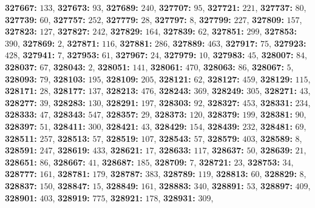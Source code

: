 \textsf{\bfseries 327667:} $133$, \textsf{\bfseries 327673:} $93$, \textsf{\bfseries 327689:} $240$, \textsf{\bfseries 327707:} $95$, \textsf{\bfseries 327721:} $221$, \textsf{\bfseries 327737:} $80$, \textsf{\bfseries 327739:} $60$, \textsf{\bfseries 327757:} $252$, \textsf{\bfseries 327779:} $28$, \textsf{\bfseries 327797:} $8$, \textsf{\bfseries 327799:} $227$, \textsf{\bfseries 327809:} $157$, \textsf{\bfseries 327823:} $127$, \textsf{\bfseries 327827:} $242$, \textsf{\bfseries 327829:} $164$, \textsf{\bfseries 327839:} $62$, \textsf{\bfseries 327851:} $299$, \textsf{\bfseries 327853:} $390$, \textsf{\bfseries 327869:} $2$, \textsf{\bfseries 327871:} $116$, \textsf{\bfseries 327881:} $286$, \textsf{\bfseries 327889:} $463$, \textsf{\bfseries 327917:} $75$, \textsf{\bfseries 327923:} $428$, \textsf{\bfseries 327941:} $7$, \textsf{\bfseries 327953:} $61$, \textsf{\bfseries 327967:} $24$, \textsf{\bfseries 327979:} $10$, \textsf{\bfseries 327983:} $45$, \textsf{\bfseries 328007:} $84$, \textsf{\bfseries 328037:} $67$, \textsf{\bfseries 328043:} $2$, \textsf{\bfseries 328051:} $141$, \textsf{\bfseries 328061:} $470$, \textsf{\bfseries 328063:} $86$, \textsf{\bfseries 328067:} $5$, \textsf{\bfseries 328093:} $79$, \textsf{\bfseries 328103:} $195$, \textsf{\bfseries 328109:} $205$, \textsf{\bfseries 328121:} $62$, \textsf{\bfseries 328127:} $459$, \textsf{\bfseries 328129:} $115$, \textsf{\bfseries 328171:} $28$, \textsf{\bfseries 328177:} $137$, \textsf{\bfseries 328213:} $476$, \textsf{\bfseries 328243:} $369$, \textsf{\bfseries 328249:} $305$, \textsf{\bfseries 328271:} $43$, \textsf{\bfseries 328277:} $39$, \textsf{\bfseries 328283:} $130$, \textsf{\bfseries 328291:} $197$, \textsf{\bfseries 328303:} $92$, \textsf{\bfseries 328327:} $453$, \textsf{\bfseries 328331:} $234$, \textsf{\bfseries 328333:} $47$, \textsf{\bfseries 328343:} $547$, \textsf{\bfseries 328357:} $29$, \textsf{\bfseries 328373:} $120$, \textsf{\bfseries 328379:} $199$, \textsf{\bfseries 328381:} $90$, \textsf{\bfseries 328397:} $51$, \textsf{\bfseries 328411:} $300$, \textsf{\bfseries 328421:} $43$, \textsf{\bfseries 328429:} $154$, \textsf{\bfseries 328439:} $232$, \textsf{\bfseries 328481:} $69$, \textsf{\bfseries 328511:} $257$, \textsf{\bfseries 328513:} $57$, \textsf{\bfseries 328519:} $107$, \textsf{\bfseries 328543:} $57$, \textsf{\bfseries 328579:} $403$, \textsf{\bfseries 328589:} $8$, \textsf{\bfseries 328591:} $247$, \textsf{\bfseries 328619:} $433$, \textsf{\bfseries 328621:} $17$, \textsf{\bfseries 328633:} $117$, \textsf{\bfseries 328637:} $50$, \textsf{\bfseries 328639:} $21$, \textsf{\bfseries 328651:} $86$, \textsf{\bfseries 328667:} $41$, \textsf{\bfseries 328687:} $185$, \textsf{\bfseries 328709:} $7$, \textsf{\bfseries 328721:} $23$, \textsf{\bfseries 328753:} $34$, \textsf{\bfseries 328777:} $161$, \textsf{\bfseries 328781:} $179$, \textsf{\bfseries 328787:} $383$, \textsf{\bfseries 328789:} $119$, \textsf{\bfseries 328813:} $60$, \textsf{\bfseries 328829:} $8$, \textsf{\bfseries 328837:} $150$, \textsf{\bfseries 328847:} $15$, \textsf{\bfseries 328849:} $161$, \textsf{\bfseries 328883:} $340$, \textsf{\bfseries 328891:} $53$, \textsf{\bfseries 328897:} $409$, \textsf{\bfseries 328901:} $403$, \textsf{\bfseries 328919:} $775$, \textsf{\bfseries 328921:} $178$, \textsf{\bfseries 328931:} $309$, 
